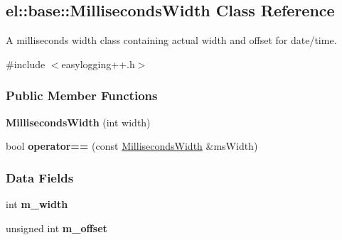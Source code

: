 \hypertarget{a00053}{}\subsection{el\+:\+:base\+:\+:Milliseconds\+Width Class Reference}
\label{a00053}


A milliseconds width class containing actual width and offset for date/time.  




{\ttfamily \#include $<$easylogging++.\+h$>$}

\subsubsection*{Public Member Functions}
\begin{DoxyCompactItemize}
\item 
\hypertarget{a00053_a358fa0fcdd4076c4038ecdfc206de38a}{}{\bfseries Milliseconds\+Width} (int width)\label{a00053_a358fa0fcdd4076c4038ecdfc206de38a}

\item 
\hypertarget{a00053_a60f5fb6e31216d1268585b98d20517ff}{}bool {\bfseries operator==} (const \hyperlink{a00053}{Milliseconds\+Width} \&ms\+Width)\label{a00053_a60f5fb6e31216d1268585b98d20517ff}

\end{DoxyCompactItemize}
\subsubsection*{Data Fields}
\begin{DoxyCompactItemize}
\item 
\hypertarget{a00053_a31c468b0323d376505c4975720c7b66e}{}int {\bfseries m\+\_\+width}\label{a00053_a31c468b0323d376505c4975720c7b66e}

\item 
\hypertarget{a00053_a0e98edbecf602a915d4d609747c52669}{}unsigned int {\bfseries m\+\_\+offset}\label{a00053_a0e98edbecf602a915d4d609747c52669}

\end{DoxyCompactItemize}
